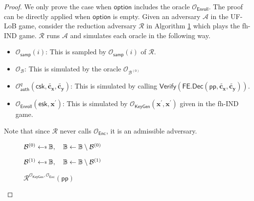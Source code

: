 \begin{proof}
\label{proof:ind-uf-lob1}
	We only prove the case when $\textsf{option}$ includes the oracle $\mathcal{O}_{\textsf{Enroll}}$. The proof can be directly applied when $\textsf{option}$ is empty. Given an adversary $\mathcal{A}$ in the \textsf{UF-LoB} game, consider the reduction adversary $\mathcal{R}$ in Algorithm \ref{alg:reduction-ind-uf-lob1_game} which plays the \textsf{fh-IND} game. $\mathcal{R}$ runs $\mathcal{A}$ and simulates each oracle in the following way.

\begin{itemize}
	\item $\mathcal{O}_{\textsf{samp}}(i)$: This is sampled by $\mathcal{O}_{\textsf{samp}}(i)$ of $\mathcal{R}$.
	
	\item $\mathcal{O}_{\mathcal{B}}$: This is simulated by the oracle $\mathcal{O}_{\mathcal{B}^{(0)}}$

	\item $\mathcal{O}_{\textsf{auth}}^q (\textsf{csk}, \mathbf{\tilde{c_x}}, \mathbf{\tilde{c_y}})$: This is simulated by calling $\textsf{Verify}( \textsf{FE.Dec}(\textsf{pp}, \mathbf{\tilde{c_x}}, \mathbf{\tilde{c_y}}) )$.

	\item $\mathcal{O}_{\textsf{Enroll}}( \textsf{esk}, \mathbf{x}^\prime )$: This is simulated by $\mathcal{O}_{\textsf{KeyGen}}(\mathbf{x}^\prime, \mathbf{x}^\prime)$ given in the \textsf{fh-IND} game.

\end{itemize}
	
\noindent Note that since $\mathcal{R}$ never calls $\mathcal{O}_{\textsf{Enc}}$, it is an admissible adversary.

\begin{figure}[h]
\centering
	
	\begin{minipage}[t]{0.5\linewidth}
	\centering
	\begin{algorithm}[H]
		\caption{$\mathcal{R}^{\mathcal{O}_{\textsf{KeyGen}}, \mathcal{O}_{\textsf{Enc}}}(\textsf{pp})$}
	\label{alg:reduction-ind-uf-lob1_game}
	\begin{algorithmic}[1]
		\State $\mathcal{B}^{(0)} \getsdollar \mathbb{B}, \quad \mathbb{B} \gets \mathbb{B} \setminus \mathcal{B}^{(0)}$

		\State $\mathcal{B}^{(1)} \getsdollar \mathbb{B}, \quad \mathbb{B} \gets \mathbb{B} \setminus \mathcal{B}^{(1)}$


\end{algorithmic}
\end{algorithm}
\end{minipage}
\end{figure}
\end{proof}
